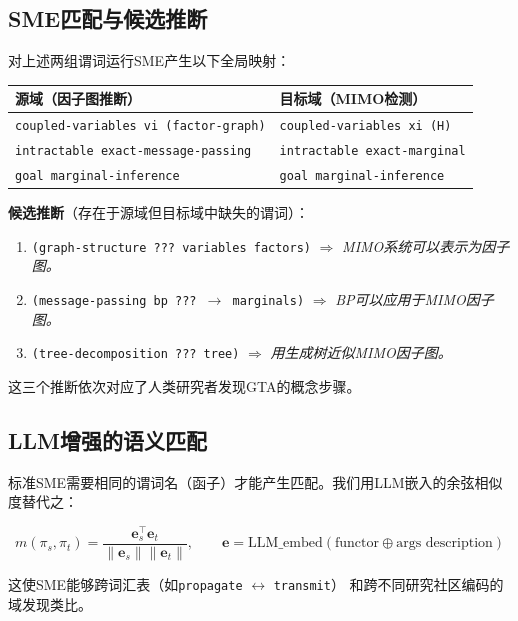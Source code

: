 \documentclass[12pt,a4paper]{article}
\begin{document}
\subsection{SME匹配与候选推断}

对上述两组谓词运行SME产生以下全局映射：

\vspace{0.3em}
\noindent
\begin{tabular}{@{}ll@{}}
  \toprule
  \textbf{源域（因子图推断）} & \textbf{目标域（MIMO检测）} \\
  \midrule
  \texttt{coupled-variables vi (factor-graph)} & \texttt{coupled-variables xi (H)} \\
  \texttt{intractable exact-message-passing} & \texttt{intractable exact-marginal} \\
  \texttt{goal marginal-inference} & \texttt{goal marginal-inference} \\
  \bottomrule
\end{tabular}

\vspace{0.6em}
\noindent
\textbf{候选推断}（存在于源域但目标域中缺失的谓词）：
\begin{enumerate}[itemsep=2pt]
  \item \texttt{(graph-structure ??? variables factors)}
        $\Rightarrow$ \emph{MIMO系统可以表示为因子图。}
  \item \texttt{(message-passing bp ??? $\to$ marginals)}
        $\Rightarrow$ \emph{BP可以应用于MIMO因子图。}
  \item \texttt{(tree-decomposition ??? tree)}
        $\Rightarrow$ \emph{用生成树近似MIMO因子图。}
\end{enumerate}

这三个推断依次对应了人类研究者发现GTA的概念步骤。

\subsection{LLM增强的语义匹配}

标准SME需要相同的谓词名（函子）才能产生匹配。我们用LLM嵌入的余弦相似度替代之：

\begin{equation}
  m(\pi_s, \pi_t) = \frac{\mathbf{e}_s^\top \mathbf{e}_t}{\|\mathbf{e}_s\|\|\mathbf{e}_t\|},
  \qquad \mathbf{e} = \mathrm{LLM\_embed}(\text{functor} \oplus \text{args description})
\end{equation}

这使SME能够跨词汇表（如\texttt{propagate} $\leftrightarrow$ \texttt{transmit}）
和跨不同研究社区编码的域发现类比。
\end{document}
